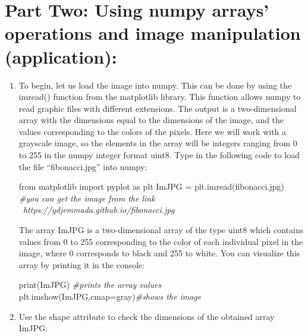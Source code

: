 \documentclass[11pt]{article}
\newenvironment{Shaded}{}{}
\newcommand{\StringTok}[1]{\textcolor[rgb]{0.25,0.44,0.63}{{#1}}}
\newcommand{\CommentTok}[1]{\textcolor[rgb]{0.38,0.63,0.69}{\textit{{#1}}}}
\newcommand{\NormalTok}[1]{{#1}}
\newcommand{\ImportTok}[1]{{#1}}
\newcommand{\OperatorTok}[1]{\textcolor[rgb]{0.40,0.40,0.40}{{#1}}}
\newcommand{\BuiltInTok}[1]{{#1}}
\begin{document}
\newpage
    \hypertarget{part-two-using-numpy-arrays-operations-and-image-manipulation-application}{%
\section*{\center Part Two: Using numpy arrays' operations and image
manipulation
(application):}\label{part-two-using-numpy-arrays-operations-and-image-manipulation-application}}

\begin{enumerate}
\def\labelenumi{\arabic{enumi}.}
\item
  To begin, let us load the image into numpy. This can be done by using
  the imread() function from the matplotlib library. This function
  allows numpy to read graphic files with different extensions. The
  output is a two-dimensional array with the dimensions equal to the
  dimensions of the image, and the values corresponding to the colors of
  the pixels. Here we will work with a grayscale image, so the elements
  in the array will be integers ranging from 0 to 255 in the numpy
  integer format uint8. Type in the following code to load the file
  ``fibonacci.jpg'' into numpy:

\begin{Shaded}
\begin{tcolorbox}[breakable, size=fbox, boxrule=1pt, pad at break*=1mm,colback=cellbackground, colframe=cellborder]
  \begin{Highlighting}[]
\ImportTok{from}\NormalTok{ matplotlib }\ImportTok{import}\NormalTok{ pyplot }\ImportTok{as}\NormalTok{ plt}
\NormalTok{ImJPG }\OperatorTok{=}\NormalTok{ plt.imread(}\StringTok{\textquotesingle{}fibonacci.jpg\textquotesingle{}}\NormalTok{)}
\CommentTok{\#you can get the image from the link}
\CommentTok{\  https://ydjemmada.github.io/fibonacci.jpg}
\end{Highlighting}
\end{tcolorbox}
\end{Shaded}

  The array ImJPG is a two-dimensional array of the type uint8 which
  contains values from 0 to 255 corresponding to the color of each
  individual pixel in the image, where 0 corresponds to black and 255 to
  white. You can visualize this array by printing it in the console:

\begin{Shaded}
\begin{tcolorbox}[breakable, size=fbox, boxrule=1pt, pad at break*=1mm,colback=cellbackground, colframe=cellborder]
  \begin{Highlighting}[]
\BuiltInTok{print}\NormalTok{(ImJPG) }\CommentTok{\#prints the array values}
\NormalTok{plt.imshow(ImJPG,cmap}\OperatorTok{=}\StringTok{\textquotesingle{}gray\textquotesingle{}}\NormalTok{)}\CommentTok{\#shows the image}
\end{Highlighting}
\end{tcolorbox}
\end{Shaded}
\item
  Use the shape attribute to check the dimensions of the obtained array
  ImJPG:


\end{enumerate}
\end{document}
